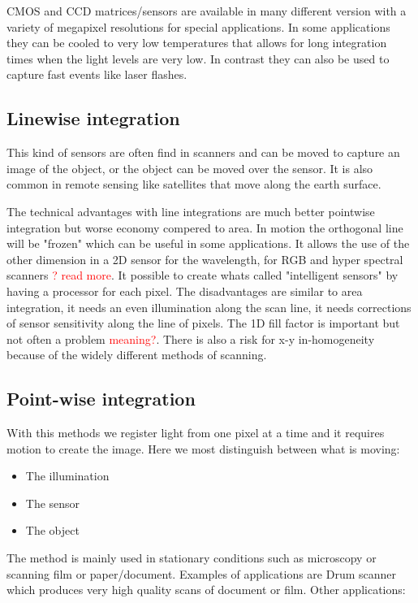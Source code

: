 CMOS and CCD matrices/sensors are available in many different version with a variety of megapixel resolutions for special applications. In some applications they can be cooled to very low temperatures that allows for long integration times when the light levels are very low. In contrast they can also be used to capture fast events like laser flashes. 

\subsection*{Linewise integration}
This kind of sensors are often find in scanners and can be moved to capture an image of the object, or the object can be moved over the sensor. It is also common in remote sensing like satellites that move along the earth surface. 

The technical advantages with line integrations are much better pointwise integration but worse economy compered to area. In motion the orthogonal line will be "frozen" which can be useful in some applications. It allows the use of the other dimension in a 2D sensor for the wavelength, for RGB and hyper spectral scanners \textcolor{red}{? read more}. It possible to create whats called "intelligent sensors" by having a processor for each pixel. 
The disadvantages are similar to area integration, it needs an even illumination along the scan line, it needs corrections of sensor sensitivity along the line of pixels. The 1D fill factor is important but not often a problem \textcolor{red}{meaning?}. There is also a risk for x-y in-homogeneity because of the widely different methods of scanning.  

\subsection*{Point-wise integration}
With this methods we register light from one pixel at a time and it requires motion to create the image. Here we most distinguish between what is moving:
\begin{itemize}
	\item The illumination
	\item The sensor
	\item The object
\end{itemize}
The method is mainly used in stationary conditions such as microscopy or scanning film or paper/document. Examples of applications are Drum scanner which produces very high quality scans of document or film. Other applications:

